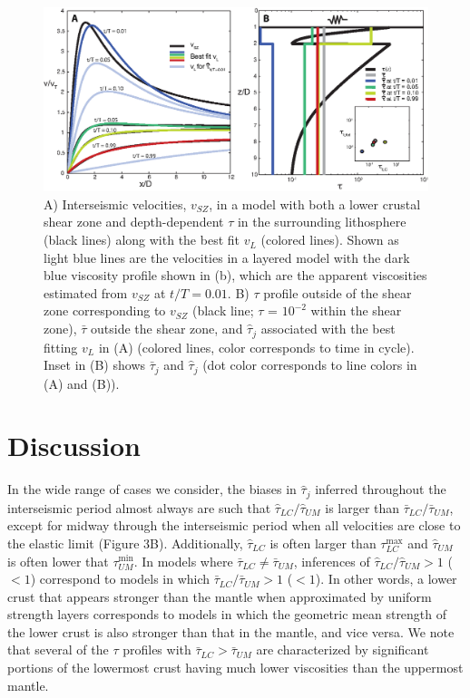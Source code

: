\begin{figure}
\includegraphics{ch1/figures/Figure4.eps}
\caption{A) Interseismic velocities, $v_{SZ}$, in a model with both a
lower crustal shear zone and depth-dependent $\tau$ in the surrounding
lithosphere (black lines) along with the best fit $v_{L}$ (colored
lines).  Shown as light blue lines are the velocities in a layered
model with the dark blue viscosity profile shown in (b), which are the
apparent viscosities estimated from $v_{SZ}$ at $t/T = 0.01$.  B)
$\tau$ profile outside of the shear zone corresponding to $v_{SZ}$
(black line; $\tau$ = $10^{-2}$ within the shear zone), $\bar{\tau}$
outside the shear zone, and $\hat{\tau}_j$ associated with the best
fitting $v_{L}$ in (A) (colored lines, color corresponds to time in
cycle). Inset in (B) shows $\bar{\tau}_j$ and $\hat{\tau}_j$ (dot
color corresponds to line colors in (A) and (B)).}
\label{Fig4}
\end{figure}

\section{Discussion}
In the wide range of cases we consider, the biases in $\hat{\tau}_j$
inferred throughout the interseismic period almost always are such
that $\hat{\tau}_{LC}/\hat{\tau}_{UM}$ is larger than
$\bar{\tau}_{LC}/\bar{\tau}_{UM}$, except for midway through the
interseismic period when all velocities are close to the elastic limit
(Figure 3B).  Additionally, $\hat{\tau}_{LC}$ is often larger than
$\tau^{\max}_{LC}$ and $\hat{\tau}_{UM}$ is often lower that
$\tau^{\min}_{UM}$.  In models where $\bar{\tau}_{LC} \ne
\bar{\tau}_{UM}$, inferences of $\hat{\tau}_{LC}/\hat{\tau}_{UM}>1$
($<1$) correspond to models in which
$\bar{\tau}_{LC}/\bar{\tau}_{UM}>1$ ($<1$). In other words, a lower
crust that appears stronger than the mantle when approximated by
uniform strength layers corresponds to models in which the geometric
mean strength of the lower crust is also stronger than that in the
mantle, and vice versa.  We note that several of the $\tau$ profiles
with $\bar{\tau}_{LC} > \bar{\tau}_{UM}$ are characterized by
significant portions of the lowermost crust having much lower
viscosities than the uppermost mantle.

